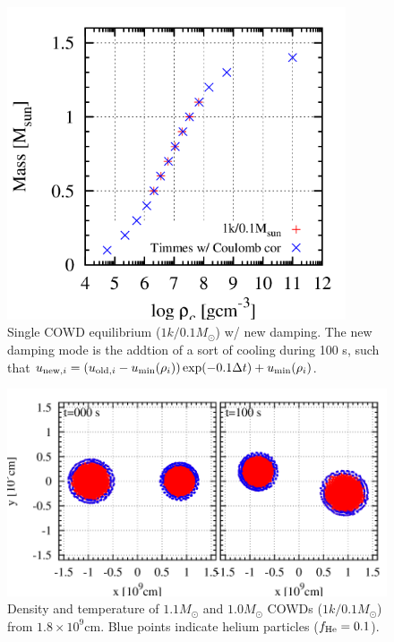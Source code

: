 \documentclass[fleqn,dvipdfmx]{article}
\begin{document}
\begin{figure}
  \begin{center}
    \includegraphics[width=10cm,bb=0 0 520 480]{fig/wdeq/draw.png}
  \end{center}
  \caption{Single COWD equilibrium ($1k/0.1M_{\odot}$) w/ new
    damping. The new damping mode is the addtion of a sort of cooling
    during 100 s, such that $u_{{\rm new},i} = (u_{{\rm old},i} -
    u_{\rm min}(\rho_i)) \exp(-0.1 \Delta t) + u_{\rm min}(\rho_i)$.}
\end{figure}

\begin{figure}
  \begin{center}
    \includegraphics[width=14cm,bb=0 0 880 480]{fig/bwd.1.8_he1e-1/draw.png}
  \end{center}
  \caption{Density and temperature of $1.1M_\odot$ and $1.0M_\odot$
    COWDs ($1k/0.1M_{\odot}$) from $1.8 \times 10^9$cm. Blue points
    indicate helium particles ($f_{\rm He}=0.1$).}
\end{figure}
\end{document}
